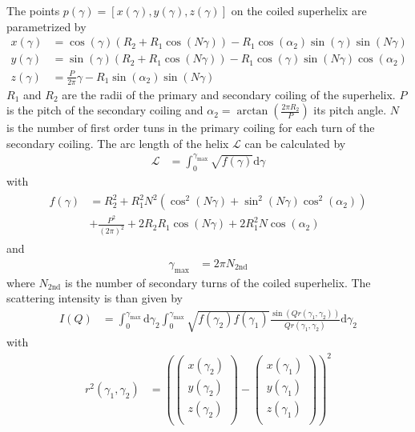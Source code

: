 The points $p(\gamma)=\left[x(\gamma),y(\gamma),z(\gamma)\right]$ on the coiled superhelix are parametrized by
\begin{align}
x(\gamma) &= \cos\left(\gamma\right) \left(R_2+R_1\cos\left(N\gamma\right)\right)
            - R_1\cos\left(\alpha_2\right)\sin\left(\gamma\right)\sin\left(N\gamma\right) \\
y(\gamma) &= \sin\left(\gamma\right) \left(R_2+R_1\cos\left(N\gamma\right)\right)
            - R_1\cos\left(\gamma\right)\sin\left(N\gamma\right)\cos\left(\alpha_2\right) \\
z(\gamma) &= \frac{P}{2\pi}\gamma - R_1\sin\left(\alpha_2\right)\sin\left(N\gamma\right)
\end{align}
$R_1$ and $R_2$ are the radii of the primary and secondary coiling of the superhelix. $P$ is the pitch of the secondary coiling and $\alpha_2= \arctan\left(\frac{2\pi R_2}{P}\right)$ its pitch angle. $N$ is the number of first order tuns in the primary coiling for each turn of the secondary coiling.
The arc length of the helix $\mathcal{L}$ can be calculated by
\begin{align}
\mathcal{L} &= \int_0^{\gamma_\mathrm{max}} \sqrt{f(\gamma)} \mathrm{d}\gamma
\end{align}
with
\begin{align}
\begin{split}
f(\gamma) &= R_2^2+R_1^2N^2 \left(\cos^2\left(N\gamma\right)+\sin^2\left(N\gamma\right)\cos^2(\alpha_2)\right) \\
&+\frac{P^2}{(2\pi)^2} + 2R_2R_1\cos\left(N\gamma\right) +2R_1^2N\cos(\alpha_2)
\end{split}
\end{align}
and
\begin{align}
\gamma_\mathrm{max} &= 2\pi N_\mathrm{2nd}
\end{align}
where $N_\mathrm{2nd}$ is the number of secondary turns of the coiled superhelix.
The scattering intensity is than given by
\begin{align}
I(Q) &= \int_0^{\gamma_\mathrm{max}} \mathrm{d}\gamma_2 \int_0^{\gamma_\mathrm{max}} \sqrt{f(\gamma_2)f(\gamma_1)}
\frac{\sin\left( Qr(\gamma_1,\gamma_2)\right)}{Qr(\gamma_1,\gamma_2)} \mathrm{d}\gamma_2
\end{align}
with
\begin{align}
r^2(\gamma_1,\gamma_2) &= \left( \begin{pmatrix}
                            x(\gamma_2) \\
                            y(\gamma_2) \\
                            z(\gamma_2) \\
                          \end{pmatrix}
                        - \begin{pmatrix}
                            x(\gamma_1) \\
                            y(\gamma_1) \\
                            z(\gamma_1) \\
                          \end{pmatrix} \right)^2
\end{align}
